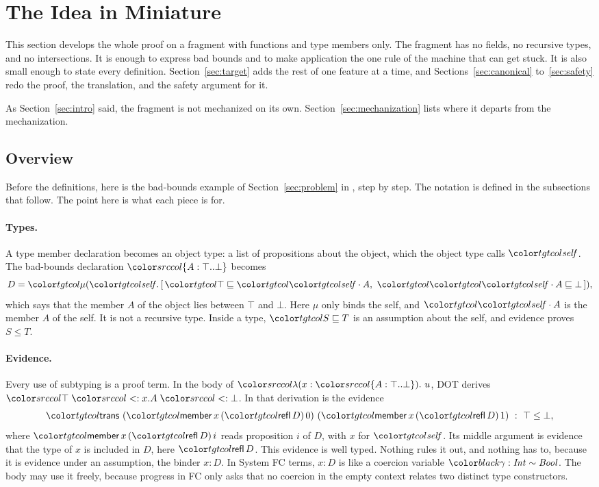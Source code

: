 \mathtgt
\section{The Idea in Miniature}\label{sec:miniature}

This section develops the whole proof on a fragment with functions and type members only. The fragment has no fields, no recursive types, and no intersections. It is enough to express bad bounds and to make application the one rule of the machine that can get stuck. It is also small enough to state every definition. Section~\ref{sec:target} adds the rest of \FCdot one feature at a time, and Sections~\ref{sec:canonical} to~\ref{sec:safety} redo the proof, the translation, and the safety argument for it.

As Section~\ref{sec:intro} said, the fragment is not mechanized on its own. Section~\ref{sec:mechanization} lists where it departs from the mechanization.

\subsection{Overview}\label{sec:mini-overview}

Before the definitions, here is the bad-bounds example of Section~\ref{sec:problem} in \FCdot, step by step. The notation is defined in the subsections that follow. The point here is what each piece is for.

\paragraph{Types.}
A type member declaration becomes an object type: a list of propositions about the object, which the object type calls $\self$. The bad-bounds declaration $\dtyp{A}{\top}{\bot}$ becomes
\[
D = \obj{[\,\ple{\top}{\sel{\self}{A}},\ \ple{\sel{\self}{A}}{\bot}\,]} ,
\]
which says that the member $A$ of the object lies between $\top$ and $\bot$. Here $\mu$ only binds the self, and $\sel{\self}{A}$ is the member $A$ of the self. It is not a recursive type. Inside a type, $\ple{S}{T}$ is an assumption about the self, and evidence proves $S \le T$.

\paragraph{Evidence.}
Every use of subtyping is a proof term. In the body of $\src{\lambda(x : \dtyp{A}{\top}{\bot}).\ u}$, DOT derives $\src{\top \sub x.A \sub \bot}$. In \FCdot that derivation is the evidence
\[
\ev{trans}\ (\ev{member}\,x\,(\ev{refl}\,D)\,0)\ (\ev{member}\,x\,(\ev{refl}\,D)\,1)\ :\ \top \le \bot ,
\]
where $\ev{member}\,x\,(\ev{refl}\,D)\,i$ reads proposition $i$ of $D$, with $x$ for $\self$. Its middle argument is evidence that the type of $x$ is included in $D$, here $\ev{refl}\,D$. This evidence is well typed. Nothing rules it out, and nothing has to, because it is evidence under an assumption, the binder $x : D$. In System FC terms, $x : D$ is like a coercion variable $\run{\gamma : \mathit{Int} \sim \mathit{Bool}}$. The body may use it freely, because progress in FC only asks that no coercion in the empty context relates two distinct type constructors.

